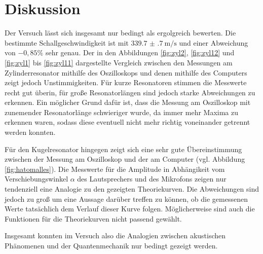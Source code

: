 \section{Diskussion}
\label{sec:Diskussion}

Der Versuch lässt sich insgesamt nur bedingt als ergolgreich bewerten. Die bestimmte
Schallgeschwindigkeit ist mit $\SI{339.7(7)}{\meter\per\second}$ und einer Abweichung
von $-0{,}85\%$ sehr genau.
Der in den Abbildungen \ref{fig:zyl2}, \ref{fig:zyl12} und \ref{fig:zyl1} bis \ref{fig:zyl11}
dargestellte Vergleich zwischen den Messungen am Zylinderresonator mithilfe des Oszilloskops und denen mithilfe des
Computers zeigt jedoch Unstimmigkeiten. Für kurze Resonatoren stimmen die Messwerte recht
gut überin, für große Resonatorlängen sind jedoch starke Abweichungen zu erkennen. Ein möglicher
Grund dafür ist, dass die Messung am Oszilloskop mit zunemender Resonatorlänge schwieriger wurde,
da immer mehr Maxima zu erkennen waren, sodass diese eventuell nicht mehr richtig voneinander getrennt
werden konnten.

Für den Kugelresonator hingegen zeigt sich eine sehr gute Übereinstimmung zwischen der Messung
am Oszilloskop und der am Computer (vgl. Abbildung \ref{fig:hatomalles}). Die Messwerte für die
Amplitude in Abhängikeit vom Verschiebungswinkel $\alpha$ des Lautsprechers und des Mikrofons
zeigen nur tendenziell eine Analogie zu den gezeigten Theoriekurven. Die Abweichungen sind
jedoch zu groß um eine Aussage darüber treffen zu können, ob die gemessenen Werte
tatsächlich dem Verlauf dieser Kurve folgen. Möglicherweise sind auch die Funktionen
für die Theoriekurven nicht passend gewählt.

Insgesamt konnten im Versuch also die Analogien zwischen akustischen Phänomenen
und der Quantenmechanik nur bedingt gezeigt werden.

